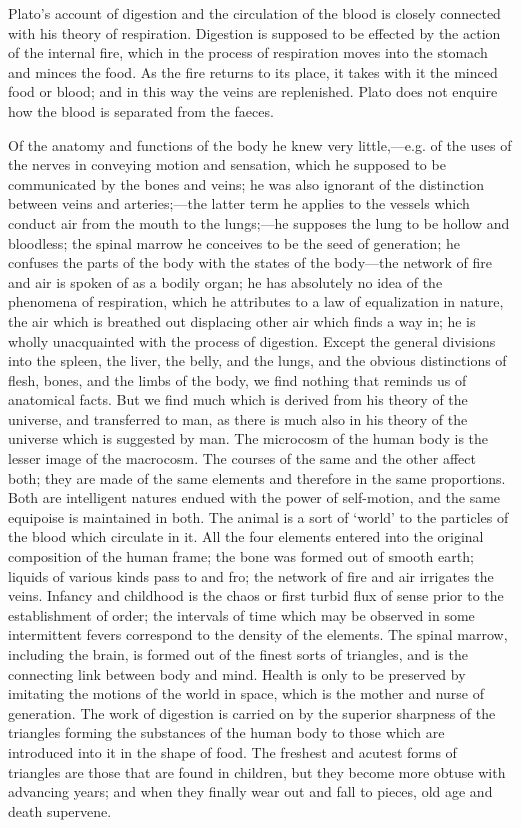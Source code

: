 \documentclass[11pt,letter]{article}
\begin{document}
\par  Plato’s account of digestion and the circulation of the blood is closely connected with his theory of respiration. Digestion is supposed to be effected by the action of the internal fire, which in the process of respiration moves into the stomach and minces the food. As the fire returns to its place, it takes with it the minced food or blood; and in this way the veins are replenished. Plato does not enquire how the blood is separated from the faeces.

\par  Of the anatomy and functions of the body he knew very little,—e.g. of the uses of the nerves in conveying motion and sensation, which he supposed to be communicated by the bones and veins; he was also ignorant of the distinction between veins and arteries;—the latter term he applies to the vessels which conduct air from the mouth to the lungs;—he supposes the lung to be hollow and bloodless; the spinal marrow he conceives to be the seed of generation; he confuses the parts of the body with the states of the body—the network of fire and air is spoken of as a bodily organ; he has absolutely no idea of the phenomena of respiration, which he attributes to a law of equalization in nature, the air which is breathed out displacing other air which finds a way in; he is wholly unacquainted with the process of digestion. Except the general divisions into the spleen, the liver, the belly, and the lungs, and the obvious distinctions of flesh, bones, and the limbs of the body, we find nothing that reminds us of anatomical facts. But we find much which is derived from his theory of the universe, and transferred to man, as there is much also in his theory of the universe which is suggested by man. The microcosm of the human body is the lesser image of the macrocosm. The courses of the same and the other affect both; they are made of the same elements and therefore in the same proportions. Both are intelligent natures endued with the power of self-motion, and the same equipoise is maintained in both. The animal is a sort of ‘world’ to the particles of the blood which circulate in it. All the four elements entered into the original composition of the human frame; the bone was formed out of smooth earth; liquids of various kinds pass to and fro; the network of fire and air irrigates the veins. Infancy and childhood is the chaos or first turbid flux of sense prior to the establishment of order; the intervals of time which may be observed in some intermittent fevers correspond to the density of the elements. The spinal marrow, including the brain, is formed out of the finest sorts of triangles, and is the connecting link between body and mind. Health is only to be preserved by imitating the motions of the world in space, which is the mother and nurse of generation. The work of digestion is carried on by the superior sharpness of the triangles forming the substances of the human body to those which are introduced into it in the shape of food. The freshest and acutest forms of triangles are those that are found in children, but they become more obtuse with advancing years; and when they finally wear out and fall to pieces, old age and death supervene.
\end{document}
